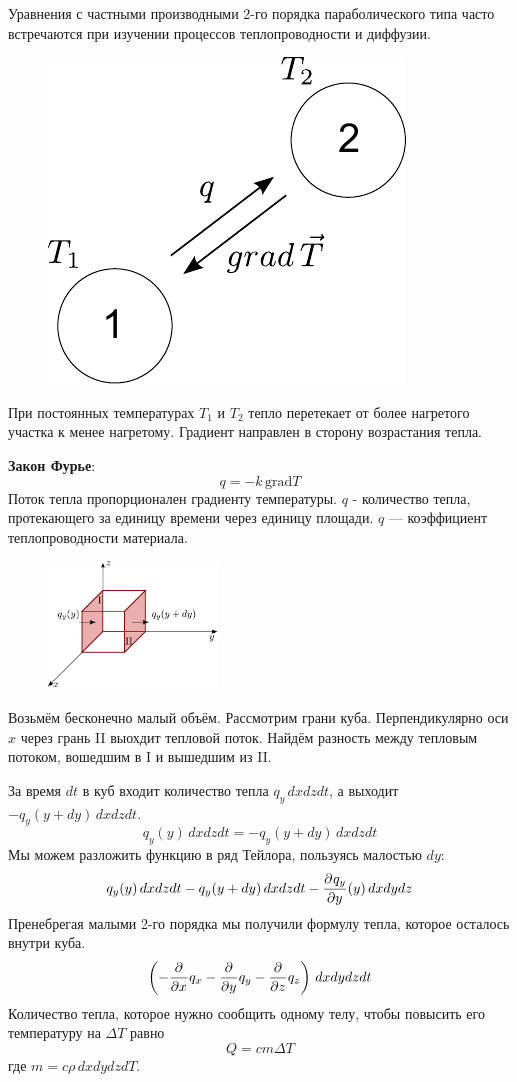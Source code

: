 Уравнения с частными производными 2-го порядка параболического типа часто встречаются при изучении процессов теплопроводности и диффузии.

\begin{figure}[h!]
    \centering
    \includegraphics[scale=0.7]{figWarm.pdf}
	
	\label{fig:figWarm}
    \end{figure}
	При постоянных температурах $T_1$ и $T_2$ тепло перетекает от более нагретого участка к менее нагретому. Градиент направлен в сторону возрастания тепла.

\textbf{Закон Фурье}:
\[
	q = - k\, \mathrm{grad} T 
\]
Поток тепла пропорционален градиенту температуры.  $q$ - количество тепла, протекающего за единицу времени через единицу площади.  $q$ --- коэффициент теплопроводности материала.

\begin{figure}
	\centering
	\includegraphics[width=0.4\textwidth]{figWarm2.pdf}
\end{figure}
Возьмём бесконечно малый объём. Рассмотрим грани куба. Перпендикулярно оси $x$ через грань II выохдит тепловой поток.  Найдём разность между тепловым потоком, вошедшим в I и вышедшим из II.

За время $dt$ в куб входит количество тепла $q_y\, dx dz dt$, а выходит $- q_y(y + dy)\, dx dz dt$.
\[
	q_y(y)\, dx dz dt = - q_y(y + dy)\, dx dz dt 
\]
Мы можем разложить функцию в ряд Тейлора, пользуясь малостью $dy$:
\[
	q_y(y)\, dx dz dt  - q_y(y + dy)\, dx dz dt  - \frac{\partial^{}q_y}{\partial y^{}} (y)\, dx dy dz
\]
Пренебрегая малыми 2-го порядка мы получили формулу тепла, которое осталось внутри куба.
\[
	\left(-\frac{\partial^{}}{\partial x^{}} q_x - \frac{\partial^{}}{\partial y^{}} q_y - \frac{\partial^{}}{\partial z^{}} q_z \right)\, dx dy dz  dt
\]
Количество тепла, которое нужно сообщить одному телу, чтобы повысить его температуру на $\Delta T$ равно
\[
	Q = c m \Delta T
\]
где $m= c \rho \,dx dy dz dT$.

